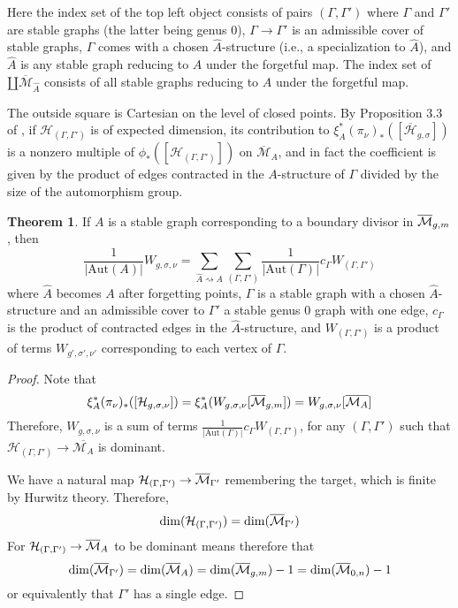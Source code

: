 \documentclass[thesis]{thesis-umich}           %
\newcommand{\Aut}{\text{Aut}}
\newcommand{\Hb}{\overline{\mathcal H}}
\theoremstyle{definition}
\newtheorem{thm}{Theorem}[section]
\begin{document}
Here the index set of the top left object
consists of pairs $(\Gamma,\Gamma')$
where $\Gamma$ and $\Gamma'$ are stable graphs (the latter being genus $0$), $\Gamma\to\Gamma'$ is an admissible cover of stable graphs, $\Gamma$
comes with a chosen $\hat A$-structure (i.e., a specialization to $\hat A$),
and $\hat A$ is any stable graph reducing to $A$ under the forgetful map.
The index set of $\amalg\overline{\mathcal M}_{\hat A}$ consists of
all stable graphs reducing to $A$ under the forgetful map.

The outside square is Cartesian on the level of closed points. By
Proposition 3.3 of \cite{Lian}, if $\mathcal H_{(\Gamma,\Gamma')}$ is of
expected dimension, its contribution to $\xi_A^*(\pi_{\nu})_*([\Hb_{g,\sigma}])$
is a nonzero multiple of $\phi_*([\mathcal H_{(\Gamma,\Gamma')}])$ on $\overline{\mathcal M}_A$, and in fact the coefficient is given by the product of edges contracted in the $A$-structure of $\Gamma$ divided by the size of the automorphism group.%

\begin{thm}
  \label{thm:admissible}
  If $A$ is a stable graph corresponding to a boundary divisor in $\overline{\mathcal M}_{g,m}$, then
  \[
  \frac 1{|\Aut(A)|}W_{g,\sigma,\nu}=\sum_{\hat A\rightsquigarrow A}\sum_{(\Gamma,\Gamma')}\frac 1{|\Aut(\Gamma)|}c_{\Gamma}W_{(\Gamma,\Gamma')}
  \]
  where $\hat A$ becomes $A$ after forgetting points, $\Gamma$ is a stable graph with a chosen $\hat A$-structure and an admissible
  cover to $\Gamma'$ a stable genus $0$ graph with one edge, $c_{\Gamma}$ is the
  product of contracted edges in the $\hat A$-structure, and
  $W_{(\Gamma,\Gamma')}$ is a product of terms $W_{g',\sigma',\nu'}$ corresponding to each vertex of $\Gamma$.
\end{thm}

\begin{proof}
  Note that
  \[
  \xi_A^*(\pi_{\nu})_*([\mathcal H_{g,\sigma,\nu}]) =
  \xi_A^*(W_{g,\sigma,\nu}[\overline{\mathcal M}_{g,m}])=
  W_{g,\sigma,\nu}[\overline{\mathcal M_A}]
  \]
  Therefore, $W_{g,\sigma,\nu}$ is a sum of
  terms $\frac 1{|\Aut(\Gamma)|}c_{\Gamma}W_{(\Gamma,\Gamma')}$, for
  any $(\Gamma,\Gamma')$ such that
  $\mathcal H_{(\Gamma,\Gamma')}\to\overline{\mathcal M_A}$
  is dominant.

  We have a natural map $\mathcal H_{(\Gamma,\Gamma')}\to \overline{\mathcal M}_{\Gamma'}$ remembering the target, which is finite by Hurwitz theory. Therefore,
  \[
  \dim(\mathcal H_{(\Gamma,\Gamma')})=\dim(\overline{\mathcal M}_{\Gamma'})
  \]
  For $\mathcal H_{(\Gamma,\Gamma')}\to\overline{\mathcal M}_A$ to be
  dominant means therefore that
  \[
  \dim(\overline{\mathcal M}_{\Gamma'})=\dim(\overline{\mathcal M}_A)=
  \dim(\overline{\mathcal M}_{g,m})-1=\dim(\overline{\mathcal M}_{0,n})-1
  \]
  or equivalently that $\Gamma'$ has a single edge.
\end{proof}
\end{document}
